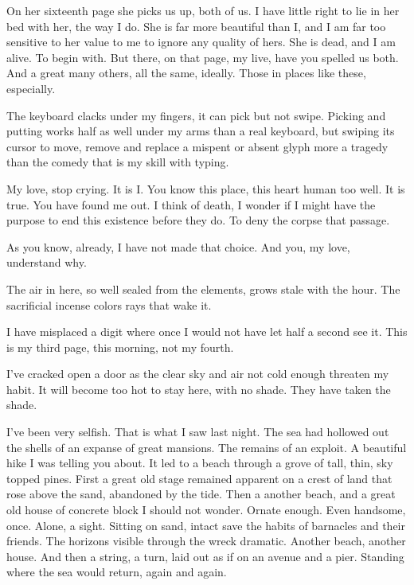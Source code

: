 

﻿On her sixteenth page she picks us up, both of us.  I have little right to lie in her bed with her, the way I do.  She is far more beautiful than I, and I am far too sensitive to her value to me to ignore any quality of hers.  She is dead, and I am alive.  To begin with.  But there, on that page, my live, have you spelled us both.  And a great many others, all the same, ideally.  Those in places like these, especially.


The keyboard clacks under my fingers, it can pick but not swipe.  Picking and putting works half as well under my arms than a real keyboard, but swiping its cursor to move, remove and replace a mispent or absent glyph more a tragedy than the comedy that is my skill with typing.


My love, stop crying.  It is I.  You know this place, this heart human too well.  It is true.  You have found me out.  I think of death, I wonder if I might have the purpose to end this existence before they do.  To deny the corpse that passage.  


As you know, already, I have not made that choice.  And you, my love, understand why.


The air in here, so well sealed from the elements, grows stale with the hour.  The sacrificial incense colors rays that wake it.


I have misplaced a digit where once I would not have let half a second see it.  This is my third page, this morning, not my fourth.


I’ve cracked open a door as the clear sky and air not cold enough threaten my habit.  It will become too hot to stay here, with no shade.  They have taken the shade.


I’ve been very selfish.  That is what I saw last night.  The sea had hollowed out the shells of an expanse of great mansions.  The remains of an exploit.  A beautiful hike I was telling you about.  It led to a beach through a grove of tall, thin, sky topped pines.  First a great old stage remained apparent on a crest of land that rose above the sand, abandoned by the tide.  Then a another beach, and a great old house of concrete block I should not wonder.  Ornate enough.  Even handsome, once.  Alone, a sight.  Sitting on sand, intact save the habits of barnacles and their friends.  The horizons visible through the wreck dramatic.  Another beach, another house.  And then a string, a turn, laid out as if on an avenue and a pier.  Standing where the sea would return, again and again.


